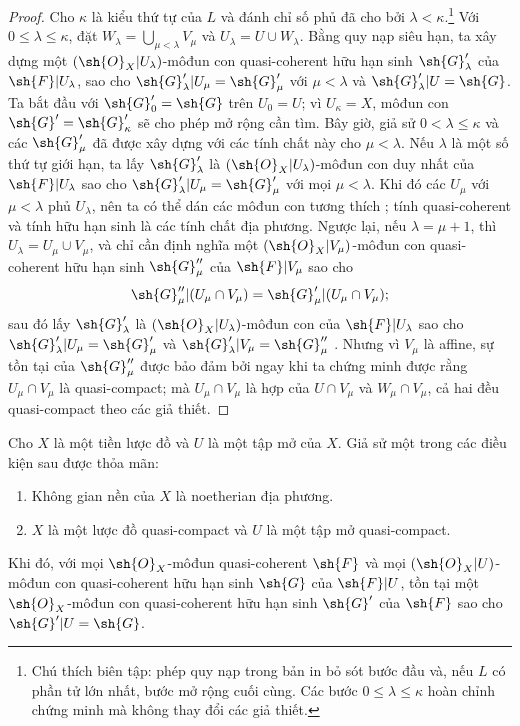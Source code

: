 \documentclass[oneside]{amsart}
\renewcommand{\leq}{\leqslant}
\let\EGAOriginalLabel\label
\renewcommand{\label}[1]{\phantomsection\EGAOriginalLabel{#1}}
\begin{document}
\begin{proof}
Cho $\kappa$ là kiểu thứ tự của $L$ và đánh chỉ số phủ đã cho bởi
$\lambda<\kappa$.\footnote{Chú thích biên tập: phép quy nạp trong bản in bỏ sót bước đầu và, nếu $L$ có phần tử lớn nhất, bước mở rộng cuối cùng. Các bước $0\leq\lambda\leq\kappa$ hoàn chỉnh chứng minh mà không thay đổi các giả thiết.}
Với $0\leq\lambda\leq\kappa$, đặt
$W_\lambda=\bigcup_{\mu<\lambda}V_\mu$ và $U_\lambda=U\cup W_\lambda$.
Bằng quy nạp siêu hạn, ta xây dựng một
$(\sh{O}_X|U_\lambda)$-môđun con quasi-coherent hữu hạn sinh $\sh{G}'_\lambda$ của
$\sh{F}|U_\lambda$, sao cho $\sh{G}'_\lambda|U_\mu=\sh{G}'_\mu$ với $\mu<\lambda$ và
$\sh{G}'_\lambda|U=\sh{G}$.
Ta bắt đầu với $\sh{G}'_0=\sh{G}$ trên $U_0=U$; vì $U_\kappa=X$, môđun con
$\sh{G}'=\sh{G}'_\kappa$ sẽ cho phép mở rộng cần tìm.
Bây giờ, giả sử $0<\lambda\leq\kappa$ và các $\sh{G}'_\mu$ đã được xây dựng
với các tính chất này cho $\mu<\lambda$.
Nếu $\lambda$ là một số thứ tự giới hạn, ta lấy $\sh{G}'_\lambda$ là
$(\sh{O}_X|U_\lambda)$-môđun con duy nhất của $\sh{F}|U_\lambda$ sao cho
$\sh{G}'_\lambda|U_\mu=\sh{G}'_\mu$ với mọi $\mu<\lambda$.
Khi đó các $U_\mu$ với $\mu<\lambda$ phủ $U_\lambda$, nên ta có thể dán
các môđun con tương thích ; tính quasi-coherent và tính hữu hạn sinh
là các tính chất địa phương.
Ngược lại, nếu $\lambda=\mu+1$, thì
$U_\lambda=U_\mu\cup V_\mu$, và chỉ cần định nghĩa một
$(\sh{O}_X|V_\mu)$-môđun con quasi-coherent hữu hạn sinh $\sh{G}''_\mu$ của
$\sh{F}|V_\mu$ sao cho
\[
  \sh{G}''_\mu|(U_\mu\cap V_\mu)=\sh{G}'_\mu|(U_\mu\cap V_\mu);
\]
sau đó lấy $\sh{G}'_\lambda$ là $(\sh{O}_X|U_\lambda)$-môđun con của
$\sh{F}|U_\lambda$ sao cho $\sh{G}'_\lambda|U_\mu=\sh{G}'_\mu$ và
$\sh{G}'_\lambda|V_\mu=\sh{G}''_\mu$ . Nhưng vì $V_\mu$ là affine,
sự tồn tại của $\sh{G}''_\mu$ được bảo đảm bởi  ngay khi ta chứng minh
được rằng $U_\mu\cap V_\mu$ là quasi-compact; mà $U_\mu\cap V_\mu$ là hợp của
$U\cap V_\mu$ và $W_\mu\cap V_\mu$, cả hai đều quasi-compact theo các giả thiết.
\end{proof}

\begin{theorem}[9.4.7]
\label{I.9.4.7}
Cho $X$ là một tiền lược đồ và $U$ là một tập mở của $X$. Giả sử một trong các điều
kiện sau được thỏa mãn:
\begin{enumerate}
  \item[{\rm(a)}] Không gian nền của $X$ là noetherian địa phương.
  \item[{\rm(b)}] $X$ là một lược đồ quasi-compact và $U$ là một tập mở quasi-compact.
\end{enumerate}
Khi đó, với mọi $\sh{O}_X$-môđun quasi-coherent $\sh{F}$ và mọi
$(\sh{O}_X|U)$-môđun con quasi-coherent hữu hạn sinh $\sh{G}$ của $\sh{F}|U$, tồn tại
một $\sh{O}_X$-môđun con quasi-coherent hữu hạn sinh $\sh{G}'$ của $\sh{F}$ sao cho
$\sh{G}'|U=\sh{G}$.
\end{theorem}
\end{document}
